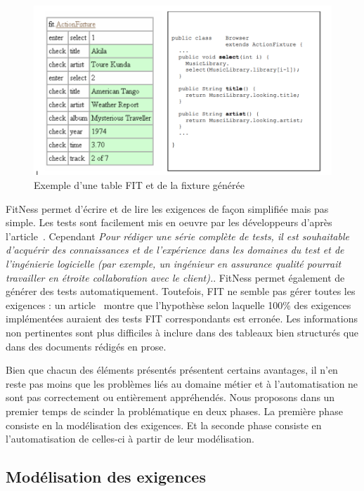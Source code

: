             \begin{figure}[H]
                \centering
                \includegraphics[width=\textwidth]{images/FIT.png}
                \caption{Exemple d'une table FIT et de la fixture générée}
            \end{figure}

        FitNess permet d'écrire et de lire les exigences de façon simplifiée mais pas simple. Les tests sont facilement mis en oeuvre par les développeurs d'après l'article~\cite{article6}. Cependant \textit{\guillemotleft Pour rédiger une série complète de tests, il est souhaitable d'acquérir des connaissances et de l'expérience dans les domaines du test et de l'ingénierie logicielle (par exemple, un ingénieur en assurance qualité pourrait travailler en étroite collaboration avec le client).\guillemotright}. FitNess permet également de générer des tests automatiquement. Toutefois, FIT ne semble pas gérer toutes les exigences : un article~\cite{article6} montre que l'hypothèse selon laquelle 100\% des exigences implémentées auraient des tests FIT correspondants est erronée. Les informations non pertinentes sont plus difficiles à inclure dans des tableaux bien structurés que dans des documents rédigés en prose.
         
Bien que chacun des éléments présentés présentent certains avantages, il n'en reste pas moins que les problèmes liés au domaine métier et à l'automatisation ne sont pas correctement ou entièrement appréhendés. Nous proposons dans un premier temps de scinder la problématique en deux phases. La première phase consiste en la modélisation des exigences. Et la seconde phase consiste en l'automatisation de celles-ci à partir de leur modélisation. 

    \subsection{Modélisation des exigences}
        

